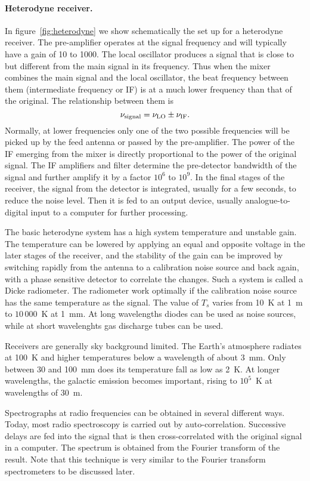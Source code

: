 \documentclass{article}
\begin{document}
\paragraph{Heterodyne receiver.}  
In figure~\ref{fig:heterodyne} we show schematically the set up for a heterodyne receiver. The
pre-amplifier operates at the signal frequency and will typically have a gain of 10 to 1000. The
local oscillator produces a signal that is close to but different from the main signal in its 
frequency. Thus when the mixer combines the main signal and the local oscillator, the beat 
frequency between them (intermediate frequency or IF) is at a much lower frequency than that of
the original. The relationship between them is 
\[
\nu_{\rm signal}=\nu_{\rm LO}\pm\nu_{\rm IF}.
\]
Normally, at lower frequencies only one of the two possible frequencies will be picked up by 
the feed antenna or passed by the pre-amplifier. The power of the IF emerging from the mixer
is directly proportional to the power of the original signal. The IF amplifiers and filter 
determine the pre-detector bandwidth of the signal and further amplify it by a factor $10^6$ to
$10^9$. In the final stages of the receiver, the signal from the detector is integrated, usually for
a few seconds, to reduce the noise level. Then it is fed to an output device, usually 
analogue-to-digital input to a computer for further processing.

The basic heterodyne system has a high system temperature and unstable gain.
The temperature can be lowered by applying an equal and opposite voltage in the
later stages of the receiver, and the stability of the gain can be improved by
switching rapidly from the antenna to a calibration noise source and back again, 
with a phase sensitive detector to correlate the changes. Such a system is called 
a Dicke radiometer. The radiometer work optimally if the calibration noise source
has the same temperature as the signal. The value of $T_s$ varies from 10~K at 
1~m to $10\,000$~K at 1~mm. At long wavelengths diodes can be used as noise 
sources, while at short wavelenghts gas discharge tubes can be used.

Receivers are generally sky background limited. The Earth's atmosphere 
radiates at 100~K and higher temperatures below a wavelength of about
3~mm. Only between 30 and 100~mm does its temperature fall as low as 
2~K. At longer wavelengths, the galactic emission becomes important, rising
to $10^5$~K at wavelengths of 30~m.

Spectrographs at radio frequencies can be obtained in several different ways. 
Today, most radio spectroscopy is carried out by auto-correlation. Successive
delays are fed into the signal that is then cross-correlated with the original
signal in a computer. The spectrum is obtained from the Fourier transform
of the result. Note that this technique is very similar to the Fourier
transform spectrometers to be discussed later.
\end{document}
